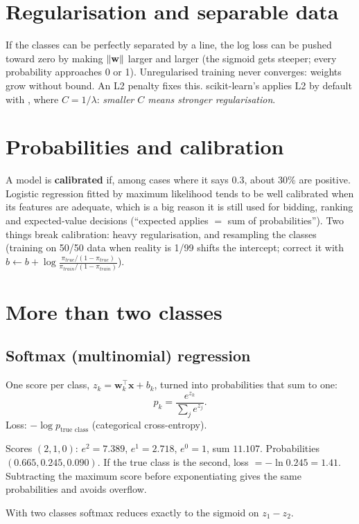 \section{Regularisation and separable data}
If the classes can be perfectly separated by a line, the log loss can be pushed toward zero by making $\lVert \mathbf w\rVert$
larger and larger (the sigmoid gets steeper; every probability approaches 0 or 1). Unregularised training never
converges: weights grow without bound. An L2 penalty fixes this. scikit-learn's  applies L2
by default with , where $C = 1/\lambda$: \emph{smaller $C$ means stronger regularisation}.

\section{Probabilities and calibration}
A model is \textbf{calibrated} if, among cases where it says 0.3, about 30\% are positive. Logistic regression fitted
by maximum likelihood tends to be well calibrated when its features are adequate, which is a big reason it is still used
for bidding, ranking and expected-value decisions (``expected applies $=$ sum of probabilities''). Two things break
calibration: heavy regularisation, and resampling the classes (training on 50/50 data when reality is 1/99 shifts the
intercept; correct it with $b \leftarrow b + \log\frac{\pi_{true}/(1-\pi_{true})}{\pi_{train}/(1-\pi_{train})}$).

\section{More than two classes}
\subsection{Softmax (multinomial) regression}
One score per class, $z_k = \mathbf w_k^\top\mathbf x + b_k$, turned into probabilities that sum to one:
\[ p_k = \frac{e^{z_k}}{\sum_j e^{z_j}}. \]
Loss: $-\log p_{\text{true class}}$ (categorical cross-entropy).
\begin{example}
Scores $(2, 1, 0)$: $e^2 = 7.389$, $e^1 = 2.718$, $e^0 = 1$, sum $11.107$. Probabilities
$(0.665, 0.245, 0.090)$. If the true class is the second, loss $= -\ln 0.245 = 1.41$.
Subtracting the maximum score before exponentiating gives the same probabilities and avoids overflow.
\end{example}
With two classes softmax reduces exactly to the sigmoid on $z_1 - z_2$.


